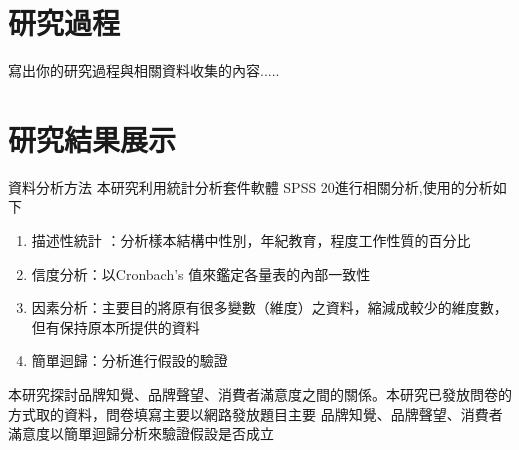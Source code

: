 \chapter{研究過程}
寫出你的研究過程與相關資料收集的內容.....

\blindtext[1]


\chapter{研究結果展示}
資料分析方法
本研究利用統計分析套件軟體 SPSS 20進行相關分析,使用的分析如下
\begin{enumerate}
\item 描述性統計 ：分析樣本結構中性別，年紀教育，程度工作性質的百分比
\item 信度分析：以Cronbach's 值來鑑定各量表的內部一致性
\item 因素分析：主要目的將原有很多變數（維度）之資料，縮減成較少的維度數，但有保持原本所提供的資料
\item 簡單迴歸：分析進行假設的驗證
\end{enumerate}

本研究探討品牌知覺、品牌聲望、消費者滿意度之間的關係。本研究已發放問卷的方式取的資料，問卷填寫主要以網路發放題目主要
品牌知覺、品牌聲望、消費者滿意度以簡單迴歸分析來驗證假設是否成立

